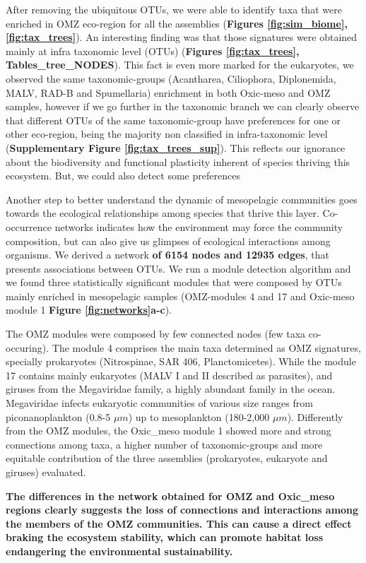 \documentclass[fleqn,10pt]{wlscirep}
\begin{document}
After removing the ubiquitous OTUs, we were able to identify taxa that were enriched in OMZ eco-region for all the assemblies (\textbf{Figures \ref{fig:sim_biome}, \ref{fig:tax_trees}}). An interesting finding was that those signatures were obtained mainly at infra taxonomic level (OTUs) (\textbf{Figures \ref{fig:tax_trees}, Tables\_tree\_NODES}). This fact is even more marked for the eukaryotes, we observed the same taxonomic-groups (Acantharea, Ciliophora, Diplonemida, MALV, RAD-B and Spumellaria) enrichment in both Oxic-meso and OMZ samples, however if we go further in the taxonomic branch we can clearly observe that different OTUs of the same taxonomic-group have preferences for one or other eco-region, being the majority non classified in infra-taxonomic level (\textbf{Supplementary Figure \ref{fig:tax_trees_sup}}). This reflects our ignorance about the biodiversity and functional plasticity inherent of species thriving this ecosystem.
But, we could also detect some preferences 

Another step to better understand the dynamic of mesopelagic communities goes towards the ecological relationships among species that thrive this layer. Co-occurrence networks indicates how the environment may force the community composition, but can also give us glimpses of ecological interactions among organisms. We derived a network \textbf{of 6154 nodes and 12935 edges}, that presents associations between OTUs. We run a module detection algorithm and we found three statistically significant modules that were composed by OTUs mainly enriched in mesopelagic samples (OMZ-modules 4 and 17 and Oxic-meso module 1 \textbf{Figure \ref{fig:networks}a-c}).

The OMZ modules were composed by few connected nodes (few taxa co-occuring).  The module 4 comprises the main taxa determined as OMZ signatures, specially prokaryotes (Nitrospinae, SAR 406, Planctomicetes). While the module 17 contains mainly eukaryotes (MALV I and II described as parasites), and giruses from the Megaviridae family, a highly abundant family in the ocean. Megaviridae infects eukaryotic communities of various size ranges from piconanoplankton (0.8-5 $\mu m$) up to mesoplankton (180-2,000 $\mu m$). Differently from the OMZ modules, the Oxic\_meso module 1 showed more and strong connections among taxa, a higher number of taxonomic-groups and more equitable contribution of the three assemblies (prokaryotes, eukaryote and giruses) evaluated.

\textbf{The differences in the network obtained for OMZ and Oxic\_meso regions clearly suggests the loss of connections and interactions among the members of the OMZ communities. This can cause a direct effect braking the ecosystem stability, which can promote habitat loss endangering the environmental sustainability.}
\end{document}
